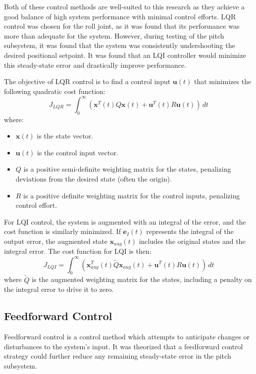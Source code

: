 Both of these control methods are well-suited to this research as they achieve a good balance of high system performance with minimal control efforts. LQR control was chosen for the roll joint, as it was found that its performance was more than adequate for the system. However, during testing of the pitch subsystem, it was found that the system was consistently undershooting the desired positional setpoint. It was found that an LQI controller would minimize this steady-state error and drastically improve performance.

The objective of LQR control is to find a control input $\mathbf{u}(t)$ that minimizes the following quadratic cost function:
$$ J_{LQR} = \int_{0}^{\infty} (\mathbf{x}^T(t) Q \mathbf{x}(t) + \mathbf{u}^T(t) R \mathbf{u}(t)) \, dt $$
where:
\begin{itemize}
    \item $\mathbf{x}(t)$ is the state vector.
    \item $\mathbf{u}(t)$ is the control input vector.
    \item $Q$ is a positive semi-definite weighting matrix for the states, penalizing deviations from the desired state (often the origin).
    \item $R$ is a positive definite weighting matrix for the control inputs, penalizing control effort.
\end{itemize}

For LQI control, the system is augmented with an integral of the error, and the cost function is similarly minimized. If $\mathbf{e}_I(t)$ represents the integral of the output error, the augmented state $\mathbf{x}_{aug}(t)$ includes the original states and the integral error. The cost function for LQI is then:
$$ J_{LQI} = \int_{0}^{\infty} (\mathbf{x}_{aug}^T(t) \tilde{Q} \mathbf{x}_{aug}(t) + \mathbf{u}^T(t) R \mathbf{u}(t)) \, dt $$
where $\tilde{Q}$ is the augmented weighting matrix for the states, including a penalty on the integral error to drive it to zero.


\subsection{Feedforward Control}

Feedforward control is a control method which attempts to anticipate changes or disturbances to the system's input. It was theorized that a feedforward control strategy could further reduce any remaining steady-state error in the pitch subsystem.

